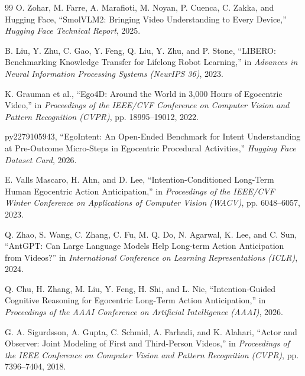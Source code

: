 \documentclass[12pt,a4paper]{report}
\begin{document}
\begin{thebibliography}{99}
O. Zohar, M. Farre, A. Marafioti, M. Noyan, P. Cuenca, C. Zakka, and Hugging Face,
\newblock ``SmolVLM2: Bringing Video Understanding to Every Device,''
\newblock \emph{Hugging Face Technical Report}, 2025.

B. Liu, Y. Zhu, C. Gao, Y. Feng, Q. Liu, Y. Zhu, and P. Stone,
\newblock ``LIBERO: Benchmarking Knowledge Transfer for Lifelong Robot Learning,''
\newblock in \emph{Advances in Neural Information Processing Systems (NeurIPS 36)}, 2023.

K. Grauman et al.,
\newblock ``Ego4D: Around the World in 3,000 Hours of Egocentric Video,''
\newblock in \emph{Proceedings of the IEEE/CVF Conference on Computer Vision and Pattern Recognition (CVPR)}, pp. 18995--19012, 2022.

py2279105943,
\newblock ``EgoIntent: An Open-Ended Benchmark for Intent Understanding at Pre-Outcome Micro-Steps in Egocentric Procedural Activities,''
\newblock \emph{Hugging Face Dataset Card}, 2026.

E. Valls Mascaro, H. Ahn, and D. Lee,
\newblock ``Intention-Conditioned Long-Term Human Egocentric Action Anticipation,''
\newblock in \emph{Proceedings of the IEEE/CVF Winter Conference on Applications of Computer Vision (WACV)}, pp. 6048--6057, 2023.

Q. Zhao, S. Wang, C. Zhang, C. Fu, M. Q. Do, N. Agarwal, K. Lee, and C. Sun,
\newblock ``AntGPT: Can Large Language Models Help Long-term Action Anticipation from Videos?''
\newblock in \emph{International Conference on Learning Representations (ICLR)}, 2024.

Q. Chu, H. Zhang, M. Liu, Y. Feng, H. Shi, and L. Nie,
\newblock ``Intention-Guided Cognitive Reasoning for Egocentric Long-Term Action Anticipation,''
\newblock in \emph{Proceedings of the AAAI Conference on Artificial Intelligence (AAAI)}, 2026.

G. A. Sigurdsson, A. Gupta, C. Schmid, A. Farhadi, and K. Alahari,
\newblock ``Actor and Observer: Joint Modeling of First and Third-Person Videos,''
\newblock in \emph{Proceedings of the IEEE Conference on Computer Vision and Pattern Recognition (CVPR)}, pp. 7396--7404, 2018.


\end{thebibliography}
\end{document}

